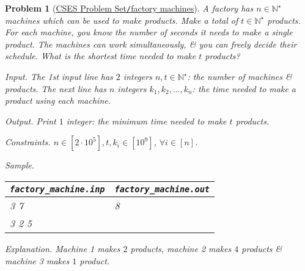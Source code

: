 \documentclass{article}
\newtheorem{problem}{Problem}
\begin{document}
\begin{problem}[\href{https://cses.fi/problemset/task/1620}{CSES Problem Set{\tt/}factory machines}]
    A factory has $n\in\mathbb{N}^\star$ machines which can be used to make products. Make a total of $t\in\mathbb{N}^\star$ products. For each machine, you know the number of seconds it needs to make a single product. The machines can work simultaneously, \& you can freely decide their schedule. What is the shortest time needed to make $t$ products?
    \item {\sf Input.} The 1st input line has $2$ integers $n,t\in\mathbb{N}^\star$: the number of machines \& products. The next line has $n$ integers $k_1,k_2,\ldots,k_n$: the time needed to make a product using each machine.
    \item {\sf Output.} Print $1$ integer: the minimum time needed to make $t$ products.
    \item {\sf Constraints.} $n\in[2\cdot10^5],t,k_i\in[10^9]$, $\forall i\in[n]$.
    \item {\sf Sample.}
    \begin{table}[H]
        \centering
        \begin{tabular}{|l|l|}
            \hline
            \verb|factory_machine.inp| & \verb|factory_machine.out| \\
            \hline
            3 7 & 8 \\
            3 2 5 & \\
            \hline
        \end{tabular}
    \end{table}
    \item {\sf Explanation.} Machine 1 makes $2$ products, machine 2 makes $4$ products \& machine 3 makes $1$ product.
\end{problem}
\end{document}
